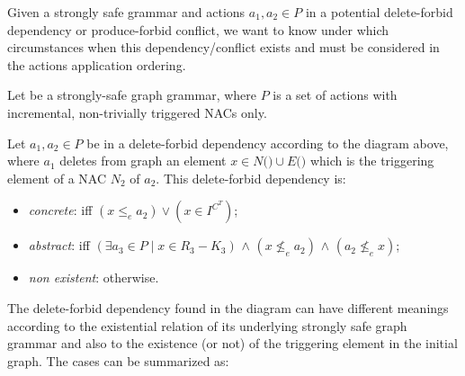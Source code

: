 \begin{intuition}
  Given a strongly safe grammar \doublyTypedGraphGrammarCore{} and actions $a_1, a_2 \in P$ in a potential delete-forbid dependency or produce-forbid conflict, we want to know under which circumstances when this dependency/conflict exists and must be considered in the actions application ordering.
\end{intuition}


\begin{definition} Let \doublyTypedGraphGrammarCore{} be a strongly-safe graph grammar, where $P$ is a set of actions with incremental, non-trivially triggered NACs only.

\hfill

  Let $a_1, a_2 \in P$ be in a delete-forbid dependency according to the diagram above, where $a_1$ deletes from graph \coreGraph{} an element $x \in N($\coreGraph$) \cup E($\coreGraph$)$ which is the triggering element of a NAC $N_2$ of $a_2$. This delete-forbid dependency is:

\begin{itemize}
  \item \emph{concrete}: iff $(x \leq_e a_2) \lor (x \in I^{C^T})$;
  \item \emph{abstract}: iff $(\exists a_3 \in P \mid x \in R_3 - K_3)$ $\land$ $(x \not\leq_e a_2)$ $\land$ $(a_2 \not\leq_e x)$;
  \item \emph{non existent}: otherwise.
\end{itemize}

\end{definition}

The delete-forbid dependency found in the diagram can have different meanings  according to the existential relation of its underlying strongly safe graph grammar and also to the existence (or not) of the triggering element in the initial graph. The cases can be summarized as:


